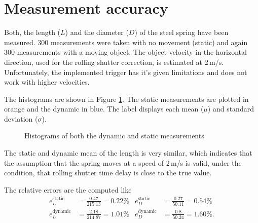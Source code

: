\section{Measurement accuracy}
Both, the length ($L$) and the diameter ($D$) of the steel spring have been measured.
300 measurements were taken with no movement (static) and again 300 measurements with a moving object.
The object velocity in the horizontal direction, used for the rolling shutter correction, is estimated at 2\,m/s.
Unfortunately, the implemented trigger has it's given limitations and does not work with higher velocities.

The histograms are shown in Figure \ref{development:hist}.
The static measurements are plotted in orange and the dynamic in blue.
The label displays each mean ($\mu$) and standard deviation ($\sigma$).
\begin{figure}[ht]
	\centering
	\caption{Histograms of both the dynamic and static measurements\label{development:hist}}		
\end{figure}
The static and dynamic mean of the length is very similar, which indicates that the assumption that the spring moves at a speed of 2\,m/s is valid, under the condition, that rolling shutter time delay is close to the true value.

The relative errors are the computed like
\begin{align*}
	e_{L}^{\text{static}}&=\frac{0.47}{215.13}=0.22\%&e_D^{\text{static}}&=\frac{0.27}{50.11}=0.54\%\\
	e_{L}^{\text{dynamic}}&=\frac{2.18}{214.87}=1.01\%&e_D^{\text{dynamic}}&=\frac{0.8}{50.24}=1.60\%.
\end{align*}

